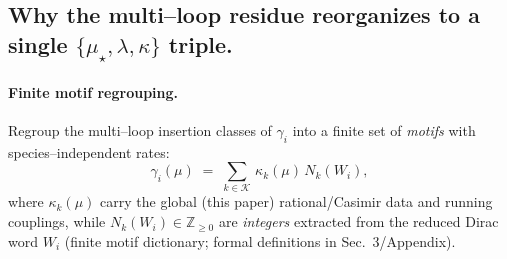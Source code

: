 \documentclass[epjc3]{svjour3}
\begin{document}
\subsection{Why the multi--loop residue reorganizes to a single $\{\mu_\star,\lambda,\kappa\}$ triple.}
\label{subsec:why-reorganizes}
\paragraph{Finite motif regrouping.}
Regroup the multi--loop insertion classes of $\gamma_i$ into a finite set of \emph{motifs} with species--independent rates:
\begin{equation}
  \gamma_i(\mu)
  \;=\;
  \sum_{k\in\mathcal K}\,\kappa_k(\mu)\,N_k(W_i),
  \label{eq:motif-decomp}
\end{equation}
where $\kappa_k(\mu)$ carry the global (this paper) rational/Casimir data and running couplings, while $N_k(W_i)\in\mathbb Z_{\ge0}$ are \emph{integers} extracted from the reduced Dirac word $W_i$ (finite motif dictionary; formal definitions in Sec.~3/Appendix).%
\end{document}
